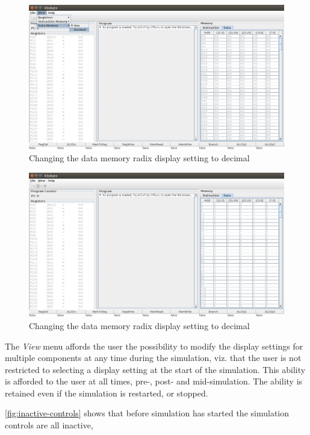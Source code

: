 \begin{figure}[H]
  \centering
  \includegraphics[width=\textwidth]{images/changing_data_memory_radix_to_dec.png} 
  \caption{Changing the data memory radix display setting to decimal} 
  \label{fig:change-radix-1}
\end{figure}

\begin{figure}[H]
  \centering
  \includegraphics[width=\textwidth]{images/radix_display_result.png} 
  \caption{Changing the data memory radix display setting to decimal} 
  \label{fig:change-radix-1-result}
\end{figure}

The \emph{View} menu affords the user the possibility to modify the
display settings for multiple components at any time during the
simulation, viz. that the user is not restricted to selecting a
display setting at the start of the simulation. This ability is
afforded to the user at all times, pre-, post- and mid-simulation.
The ability is retained even if the simulation is restarted, or
stopped.

\autoref{fig:inactive-controls} shows that before simulation has
started the simulation controls are all inactive,


